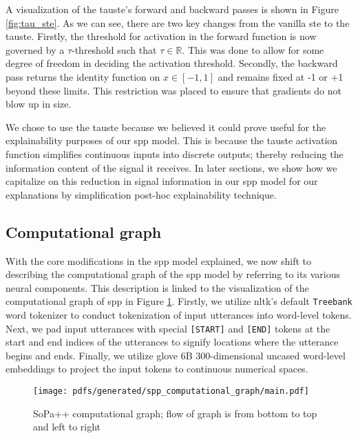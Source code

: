 A visualization of the \ac{tauste}'s forward and backward passes is shown in Figure
\ref{fig:tau_ste}. As we can see, there are two key changes from the vanilla \ac{ste}
to the \ac{tauste}. Firstly, the threshold for activation in the forward function is
now governed by a $\tau$-threshold such that $\tau \in \mathbb{R}$. This was
done to allow for some degree of freedom in deciding the activation threshold.
Secondly, the backward pass returns the identity function on $x \in [-1,1]$ and
remains fixed at -1 or +1 beyond these limits. This restriction was placed to
ensure that gradients do not blow up in size.

We chose to use the \ac{tauste} because we believed it could prove useful for
the explainability purposes of our \ac{spp} model. This is because the
\ac{tauste} activation function simplifies continuous inputs into discrete
outputs; thereby reducing the information content of the signal it receives. In
later sections, we show how we capitalize on this reduction in signal
information in our \ac{spp} model for our explanations by simplification
post-hoc explainability technique.

\subsection{Computational graph}

With the core modifications in the \ac{spp} model explained, we now shift to
describing the computational graph of the \ac{spp} model by
referring to its various neural components. This description is linked to the
visualization of the computational graph of \ac{spp} in Figure \ref{fig:spp_cg}.
Firstly, we utilize \ac{nltk}'s default \texttt{Treebank} word tokenizer
\citep{bird-loper-2004-nltk} to conduct tokenization of input utterances into
word-level tokens. Next, we pad input utterances with special \texttt{[START]}
and \texttt{[END]} tokens at the start and end indices of the utterances to
signify locations where the utterance begins and ends. Finally, we utilize
\ac{glove} 6B 300-dimensional uncased word-level embeddings
\citep{pennington2014glove} to project the input tokens to continuous numerical
spaces. 

\begin{figure}[t!]
  \centering
  \texttt{[image: pdfs/generated/spp\_computational\_graph/main.pdf]}
  \caption{SoPa++ computational graph; flow of graph is
    from bottom to top and left to right }
  \label{fig:spp_cg}
\end{figure}

